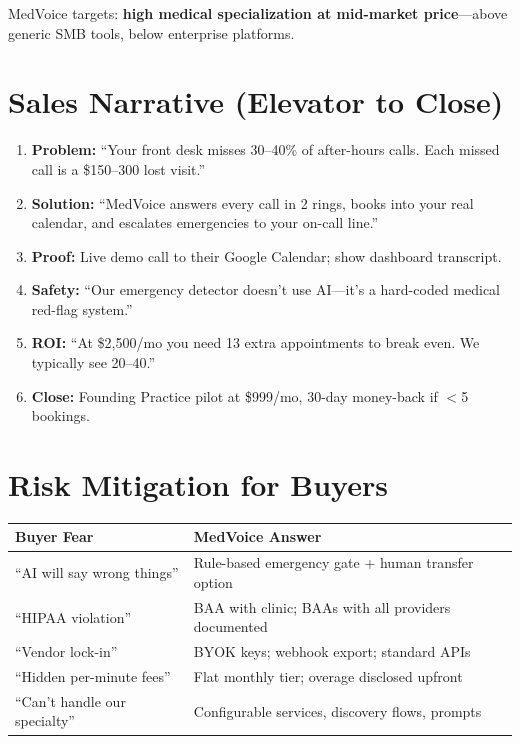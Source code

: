 \documentclass[11pt,a4paper]{article}
\begin{document}
MedVoice targets: \textbf{high medical specialization at mid-market price}---above generic SMB tools, below enterprise platforms.

\section{Sales Narrative (Elevator to Close)}

\begin{enumerate}
  \item \textbf{Problem:} ``Your front desk misses 30--40\% of after-hours calls. Each missed call is a \$150--300 lost visit.''
  \item \textbf{Solution:} ``MedVoice answers every call in 2 rings, books into your real calendar, and escalates emergencies to your on-call line.''
  \item \textbf{Proof:} Live demo call to their Google Calendar; show dashboard transcript.
  \item \textbf{Safety:} ``Our emergency detector doesn't use AI---it's a hard-coded medical red-flag system.''
  \item \textbf{ROI:} ``At \$2,500/mo you need 13 extra appointments to break even. We typically see 20--40.''
  \item \textbf{Close:} Founding Practice pilot at \$999/mo, 30-day money-back if $<$5 bookings.
\end{enumerate}

\section{Risk Mitigation for Buyers}

\begin{center}
\small
\begin{tabular}{@{}ll@{}}
\toprule
\textbf{Buyer Fear} & \textbf{MedVoice Answer} \\
\midrule
``AI will say wrong things'' & Rule-based emergency gate + human transfer option \\
``HIPAA violation'' & BAA with clinic; BAAs with all providers documented \\
``Vendor lock-in'' & BYOK keys; webhook export; standard APIs \\
``Hidden per-minute fees'' & Flat monthly tier; overage disclosed upfront \\
``Can't handle our specialty'' & Configurable services, discovery flows, prompts \\
\bottomrule
\end{tabular}
\end{center}
\end{document}
